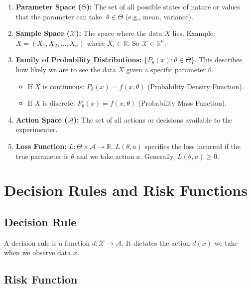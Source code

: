 \documentclass[
  letterpaper,
  DIV=11,
  numbers=noendperiod]{scrreprt}
\providecommand{\tightlist}{%
  \setlength{\itemsep}{0pt}\setlength{\parskip}{0pt}}
\renewcommand{\[}{\begin{equation}}
\renewcommand{\]}{\end{equation}}
\theoremstyle{definition}
\theoremstyle{plain}
\theoremstyle{plain}
\theoremstyle{plain}
\theoremstyle{definition}
\theoremstyle{plain}
\theoremstyle{remark}
\begin{document}
\begin{enumerate}
\def\labelenumi{\arabic{enumi}.}
\item
  \textbf{Parameter Space (\(\Theta\)):} The set of all possible states
  of nature or values that the parameter can take. \(\theta \in \Theta\)
  (e.g., mean, variance).
\item
  \textbf{Sample Space (\(\mathcal{X}\)):} The space where the data
  \(X\) lies. Example: \(X = (X_1, X_2, \dots, X_n)\) where
  \(X_i \in \mathbb{R}\). So \(\mathcal{X} \in \mathbb{R}^n\).
\item
  \textbf{Family of Probability Distributions:}
  \(\{P_\theta(x) : \theta \in \Theta\}\). This describes how likely we
  are to see the data \(X\) given a specific parameter \(\theta\).

  \begin{itemize}
  \tightlist
  \item
    If \(X\) is continuous: \(P_\theta(x) = f(x, \theta)\) (Probability
    Density Function).
  \item
    If \(X\) is discrete: \(P_\theta(x) = f(x, \theta)\) (Probability
    Mass Function).
  \end{itemize}
\item
  \textbf{Action Space (\(\mathcal{A}\)):} The set of all actions or
  decisions available to the experimenter.
\item
  \textbf{Loss Function:}
  \(L: \Theta \times \mathcal{A} \rightarrow \mathbb{R}\).
  \(L(\theta, a)\) specifies the loss incurred if the true parameter is
  \(\theta\) and we take action \(a\). Generally,
  \(L(\theta, a) \ge 0\).
\end{enumerate}

\section{Decision Rules and Risk
Functions}\label{decision-rules-and-risk-functions}

\subsection{Decision Rule}\label{decision-rule}

A decision rule is a function
\(d: \mathcal{X} \rightarrow \mathcal{A}\). It dictates the action
\(d(x)\) we take when we observe data \(x\).

\subsection{Risk Function}\label{risk-function}
\end{document}

